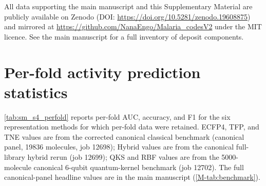 \documentclass[11pt,a4paper]{article}
\begin{document}
All data supporting the main manuscript and this Supplementary Material are publicly available on Zenodo (DOI: \url{https://doi.org/10.5281/zenodo.19608875}) and mirrored at \url{https://github.com/NanaEngo/Malaria_codesV2} under the MIT licence. See the main manuscript for a full inventory of deposit components.






\section{Per-fold activity prediction statistics}
\label{sec:per_fold}

 \cref{tab:sm_s4_perfold} reports per-fold AUC, accuracy, and F1 for the six representation methods for which per-fold data were retained. ECFP4, TFP, and TNE values are from the corrected canonical classical benchmark (canonical panel, \num{19836} molecules, job 12698); Hybrid values are from the canonical full-library hybrid rerun (job 12699); QKS and RBF values are from the \num{5000}-molecule canonical 6-qubit quantum-kernel benchmark (job 12702). The full canonical-panel headline values are in the main manuscript (\cref{M-tab:benchmark}).
\end{document}
